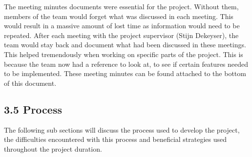 \documentclass[11pt]{article}
\begin{document}
The meeting minutes documents were essential for the project. Without them, members of the team would forget what was discussed in each meeting. This would result in a massive amount of lost time as information would need to be repeated. After each meeting with the project supervisor (Stijn Dekeyser), the team would stay back and document what had been discussed in these meetings. This helped tremendously when working on specific parts of the project. This is because the team now had a reference to look at, to see if certain features needed to be implemented. These meeting minutes can be found attached to the bottom of this document.


\subsection{3.5 Process}
The following sub sections will discuss the process used to develop the project, the difficulties encountered with this process and beneficial strategies used throughout the project duration.
\end{document}
